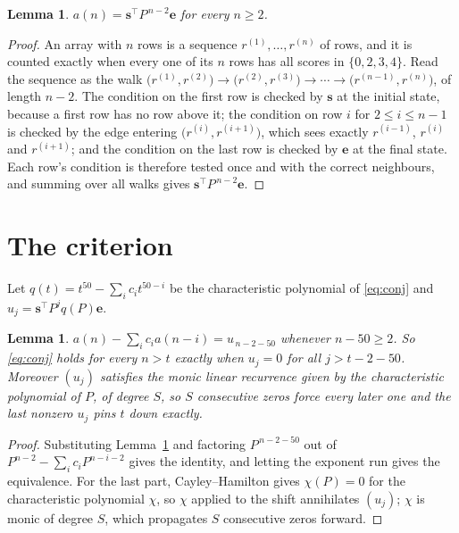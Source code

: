 \documentclass[11pt,a4paper]{article}
\theoremstyle{plain}
\newtheorem{lemma}[theorem]{Lemma}
\theoremstyle{definition}
\begin{document}
\begin{lemma}\label{lem:walk}
$a(n)=\mathbf{s}^{\!\top}P^{\,n-2}\mathbf{e}$ for every $n\ge2$.
\end{lemma}

\begin{proof}
An array with $n$ rows is a sequence $r^{(1)},\dots,r^{(n)}$ of rows, and it is counted
exactly when every one of its $n$ rows has all scores in $\{0,2,3,4\}$. Read the sequence as the
walk $\bigl(r^{(1)},r^{(2)}\bigr)\to\bigl(r^{(2)},r^{(3)}\bigr)\to\cdots\to
\bigl(r^{(n-1)},r^{(n)}\bigr)$, of length $n-2$. The condition on the first row is
checked by $\mathbf{s}$ at the initial state, because a first row has no row above it; the
condition on row $i$ for $2\le i\le n-1$ is checked by the edge entering
$\bigl(r^{(i)},r^{(i+1)}\bigr)$, which sees exactly $r^{(i-1)}$, $r^{(i)}$ and
$r^{(i+1)}$; and the condition on the last row is checked by $\mathbf{e}$ at the final
state. Each row's condition is therefore tested once and with the correct neighbours, and
summing over all walks gives $\mathbf{s}^{\!\top}P^{\,n-2}\mathbf{e}$.
\end{proof}

\section{The criterion}

Let $q(t)=t^{50}-\sum_i c_i t^{50-i}$ be the characteristic polynomial of
\eqref{eq:conj} and $u_j=\mathbf{s}^{\!\top}P^{j}q(P)\mathbf{e}$.

\begin{lemma}\label{lem:crit}
$a(n)-\sum_i c_i a(n-i)=u_{\,n-2-50}$ whenever $n-50\ge2$. So \eqref{eq:conj}
holds for every $n>t$ exactly when $u_j=0$ for all $j>t-2-50$. Moreover $(u_j)$
satisfies the monic linear recurrence given by the characteristic polynomial of $P$, of
degree $S$, so $S$ consecutive zeros force every later one and the last nonzero $u_j$ pins
$t$ down exactly.
\end{lemma}

\begin{proof}
Substituting Lemma~\ref{lem:walk} and factoring $P^{\,n-2-50}$ out of
$P^{n-2}-\sum_i c_i P^{n-i-2}$ gives the identity, and letting the exponent run gives the
equivalence. For the last part, Cayley--Hamilton gives $\chi(P)=0$ for the characteristic
polynomial $\chi$, so $\chi$ applied to the shift annihilates $(u_j)$; $\chi$ is monic of
degree $S$, which propagates $S$ consecutive zeros forward.
\end{proof}
\end{document}
